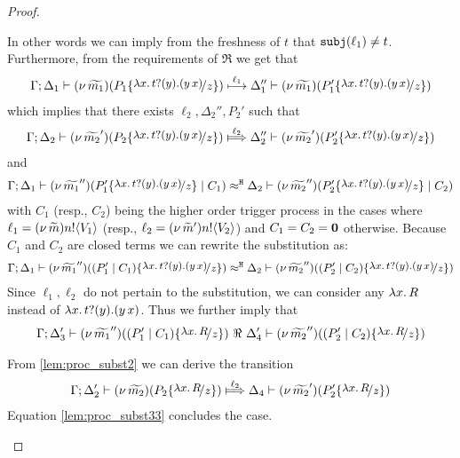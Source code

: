 \begin{proof}
\begin{enumerate}
				In other words we can imply from the freshness of $t$ that $\mathtt{subj}(\ell_1) \not= t$.
				Furthermore, from the requirements of $\Re$
				we get that
				\begin{eqnarray*}
					\horel{\Gamma}{\Delta_1}{\newsp{\widetilde{m_1}}{P_1 \subst{\trvalx{t}}{z} }}
					{\hby{\ell_1}}
					{\Delta_1''}{\newsp{\widetilde{m_1}}{P_1' \subst{\trvalx{t}}{z} }}
				\end{eqnarray*}
				which implies that there exists $\ell_2, \Delta_2'', P_2'$ such that
				\begin{eqnarray}
					\horel{\Gamma}{\Delta_2}{\newsp{\widetilde{m_2}'}{P_2 \subst{\trvalx{t}}{z} }}
					{\Hby{\ell_2}}
					{\Delta_2''}{\newsp{\widetilde{m_2}'}{P_2' \subst{\trvalx{t}}{z} }}
					\label{lem:proc_subst0}
				\end{eqnarray}
				and
				\begin{eqnarray*}
					\horel{\Gamma}{\Delta_1}{\newsp{\widetilde{m_1}''}{P_1' \subst{\trvalx{t}}{z} \Par C_1}}
					{\hwb}
					{\Delta_2}{\newsp{\widetilde{m_2}''}{P_2' \subst{\trvalx{t}}{z} \Par C_2}}
				\end{eqnarray*}
				with $C_1$ (resp., $C_2$) being the higher order trigger process
				in the cases where $\ell_1 = (\nu\, \widetilde{m}) n ! \langle V_1 \rangle$ (resp., $\ell_2 = (\nu\, \widetilde{m}') n ! \langle V_2 \rangle$)
				and $C_1 = C_2 = \mathbf{0}$ otherwise.
				Because $C_1$ and $C_2$ are closed terms we can rewrite the substitution as:
				\begin{eqnarray*}
					\horel{\Gamma}{\Delta_1}{\newsp{\widetilde{m_1}''}{(P_1'\Par C_1) \subst{\trvalx{t}}{z}}}
					{\hwb}
					{\Delta_2}{\newsp{\widetilde{m_2}''}{(P_2'\Par C_2) \subst{\trvalx{t}}{z}}}
				\end{eqnarray*}
				Since $\ell_1, \ell_2$ do not pertain to the substitution,
				we can consider any $\lambda x.\,R$ instead of $\lambda x.\,t ? (y) . (y\, {x})$.
				Thus we further imply that
				\begin{eqnarray}
					\horel{\Gamma}{\Delta_3'}{\newsp{\widetilde{m_1}''}{(P_1'\Par C_1) \subst{{\abs{x}{R}}}{z}}}
					{\ \Re\ }
					{\Delta_4'}{\newsp{\widetilde{m_2}''}{(P_2'\Par C_2) \subst{{\abs{x}{R}}}{z}}}
					\label{lem:proc_subst33}
				\end{eqnarray}

				From \eqref{lem:proc_subst2} we can derive the transition
				\begin{eqnarray*}
					\horel{\Gamma}{\Delta_2'}{\newsp{\widetilde{m_2}}{P_2 \subst{{\abs{x}{R}}}{z} }}
					{\Hby{\ell_2}}
					{\Delta_4}{\newsp{\widetilde{m_2}'}{P_2' \subst{{\abs{x}{R}}}{z} }}
				\end{eqnarray*}
				Equation \eqref{lem:proc_subst33} concludes the case.



\end{enumerate}
\end{proof}
